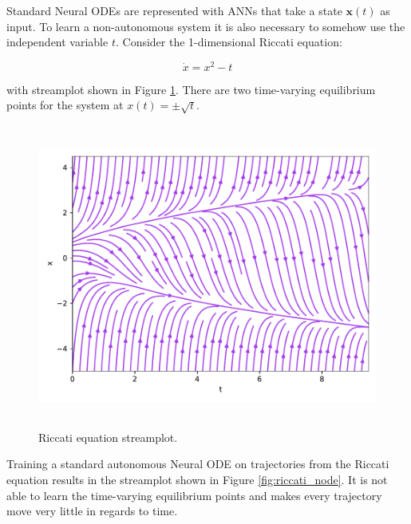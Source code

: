 \documentclass[12pt,a4paper]{book}
\begin{document}
Standard Neural ODEs are represented with ANNs that take a state $\bm{x}(t)$ as input. To learn a non-autonomous system it is also necessary to somehow use the independent variable $t$. Consider the 1-dimensional Riccati equation:

\begin{equation}
    \dot{x} = x^2 - t
    \label{eq:riccati}
\end{equation}

\noindent with streamplot shown in Figure \ref{fig:riccati_true}. There are two time-varying equilibrium points for the system at $x(t) = \pm \sqrt{t}$.

\begin{figure}[H]
    \centering
    \includegraphics[height=10cm]{figs/riccati_true.pdf}
    \caption{Riccati equation streamplot.}
    \label{fig:riccati_true}
\end{figure}

Training a standard autonomous Neural ODE on trajectories from the Riccati equation results in the streamplot shown in Figure \ref{fig:riccati_node}. It is not able to learn the time-varying equilibrium points and makes every trajectory move very little in regards to time.
\end{document}
